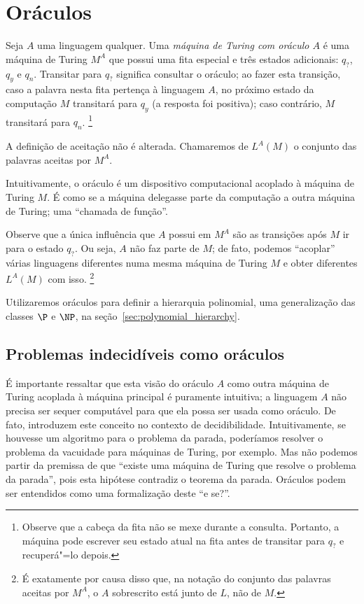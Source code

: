 \chapter{Oráculos}

\begin{definition}
    Seja $A$ uma linguagem qualquer.
    Uma \emph{máquina de Turing com oráculo $A$}
    é uma máquina de Turing $M^A$ que possui uma fita especial
    e três estados adicionais: $q_?$, $q_y$ e $q_n$.
    Transitar para $q_?$ significa consultar o oráculo;
    ao fazer esta transição,
    caso a palavra nesta fita pertença à linguagem $A$,
    no próximo estado da computação $M$ transitará para $q_y$
    (a resposta foi positiva);
    caso contrário, $M$ transitará para $q_n$.%
    \footnote{
        Observe que a cabeça da fita não se mexe durante a consulta.
        Portanto, a máquina pode escrever seu estado atual na fita
        antes de transitar para $q_?$ e recuperá"=lo depois.
    }

    A definição de aceitação não é alterada.
    Chamaremos de $L^A(M)$ o conjunto das palavras aceitas por $M^A$.
\end{definition}

Intuitivamente, o oráculo é um dispositivo computacional
acoplado à máquina de Turing $M$.
É como se a máquina delegasse parte da computação
a outra máquina de Turing;
uma ``chamada de função''.

Observe que a única influência que $A$ possui em $M^A$
são as transições após $M$ ir para o estado $q_?$.
Ou seja, $A$ não faz parte de $M$;
de fato, podemos ``acoplar'' várias linguagens diferentes
numa mesma máquina de Turing $M$
e obter diferentes $L^A(M)$ com isso.%
\footnote{
    É exatamente por causa disso que,
    na notação do conjunto das palavras aceitas por $M^A$,
    o $A$ sobrescrito está junto de $L$, não de $M$.
}

Utilizaremos oráculos para definir a hierarquia polinomial,
uma generalização das classes $\P$ e $\NP$,
na seção~\ref{sec:polynomial_hierarchy}.

\section{Problemas indecidíveis como oráculos}

É importante ressaltar que esta visão do oráculo $A$
como outra máquina de Turing acoplada à máquina principal
é puramente intuitiva;
a linguagem $A$ não precisa ser sequer computável
para que ela possa ser usada como oráculo.
De fato, 
introduzem este conceito no contexto de decidibilidade.
Intuitivamente, se houvesse um algoritmo para o problema da parada,
poderíamos resolver o problema da vacuidade para máquinas de Turing,
por exemplo.
Mas não podemos partir da premissa de que
``existe uma máquina de Turing que resolve o problema da parada'',
pois esta hipótese contradiz o teorema da parada.
Oráculos podem ser entendidos como uma formalização deste ``e se?''.


